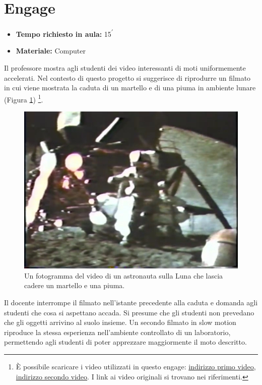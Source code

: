 \documentclass{report} \usepackage[T1]{fontenc} \usepackage[italian]{babel}
\begin{document}
\section{Engage}

\begin{itemize}
\item \textbf{Tempo richiesto in aula:} 15\textsuperscript{$\prime$}
\item \textbf{Materiale:} Computer
\end{itemize}

Il professore mostra agli studenti dei video interessanti di moti uniformemente
accelerati. Nel contesto di questo progetto si suggerisce di riprodurre un
filmato in cui viene mostrata la caduta di un martello e di
una piuma in ambiente lunare (Figura \ref{fig:hammer_feather_moon})
\footnote{
          \`E possibile scaricare i video utilizzati in questo engage:
            \textcolor{blue}{\href{https://github.com/savaroskij/PED1/blob/master/progetto_finale/media/video/Hammer-Feather_Moon.mp4?raw=true}{indirizzo primo video}},
            \textcolor{blue}{\href{https://github.com/savaroskij/PED1/blob/master/progetto_finale/media/video/Ball-Feather_Vacuum.mp4?raw=true}{indirizzo secondo video}}.
            I link ai video originali si trovano nei
            riferimenti\cite{moon}\cite{bowling}.
         }.
\begin{figure}[H]
\centering
  \includegraphics[width=\textwidth]{hammer_feather_moon}
  \caption{Un fotogramma del video di un astronauta sulla Luna che lascia
           cadere un martello e una piuma.}
  \label{fig:hammer_feather_moon}
\end{figure}
Il docente interrompe il filmato nell’istante
precedente alla caduta e domanda agli studenti che cosa si aspettano accada. Si
presume che gli studenti non prevedano che gli oggetti arrivino al suolo
insieme.
Un secondo filmato in slow motion riproduce la stessa esperienza nell’ambiente
controllato di un laboratorio, permettendo agli studenti di poter apprezzare
maggiormente il moto descritto.
\end{document}

